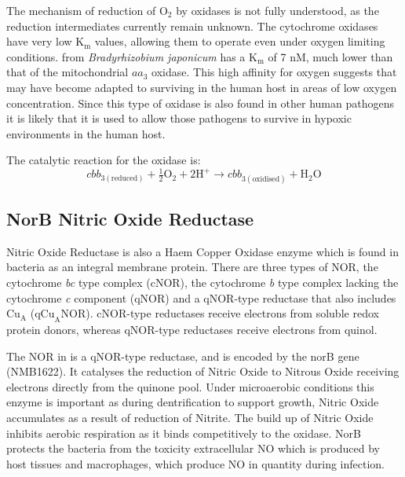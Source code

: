 The mechanism of reduction of $\mathrm{O}_2$ by \cbbthree{} oxidases is not fully understood, as the reduction intermediates currently remain unknown\cite{Huang2010}. The cytochrome \cbbthree{} oxidases have very low $\mathrm{K}_\mathrm{m}$ values, allowing them to operate even under oxygen limiting conditions. \cbbthree{} from \textit{Bradyrhizobium japonicum} has a $\mathrm{K}_\mathrm{m}$ of 7 nM, much lower than that of the mitochondrial $aa_3$ oxidase\cite{Zufferey1996}. This high affinity for oxygen suggests that \Nm{} may have become adapted to surviving in the human host in areas of low oxygen concentration. Since this type of oxidase is also found in other human pathogens it is likely that it is used to allow those pathogens to survive in hypoxic environments in the human host\cite{Preisig1996a}.

The catalytic reaction for the \cbbthree{} oxidase is:
\begin{equation}
cbb_{3\mathrm{(reduced)}} + \tfrac{1}{2}\mathrm{O}_2 + 2\mathrm{H}^+ \rightarrow cbb_{3\mathrm{(oxidised)}} + \mathrm{H}_2\mathrm{O}
\end{equation}

\subsection{NorB Nitric Oxide Reductase}
Nitric Oxide Reductase is also a Haem Copper Oxidase enzyme which is found in bacteria as an integral membrane protein. There are three types of NOR, the cytochrome \textit{bc} type complex (cNOR), the cytochrome \textit{b} type complex lacking the cytochrome \textit{c} component (qNOR) and a qNOR-type reductase that also includes $\mathrm{Cu}_{\mathrm{A}}$ ($\mathrm{qCu}_{\mathrm{A}}\mathrm{NOR}$). cNOR-type reductases receive electrons from soluble redox protein donors, whereas qNOR-type reductases receive electrons from quinol\cite{Householder2000}.

The NOR in \Nm{} is a qNOR-type reductase, and is encoded by the norB gene (NMB1622). It catalyses the reduction of Nitric Oxide to Nitrous Oxide receiving electrons directly from the quinone pool. Under microaerobic conditions this enzyme is important as during dentrification to support growth, Nitric Oxide accumulates as a result of reduction of Nitrite. The build up of Nitric Oxide inhibits aerobic respiration as it binds competitively to the \cbbthree{} oxidase. NorB protects the bacteria from the toxicity extracellular NO which is produced by host tissues and macrophages, which produce NO in quantity during infection\cite{Heurlier2008}.

